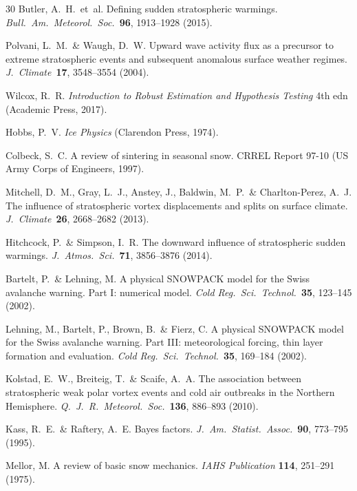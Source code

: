 \documentclass[11pt,letterpaper]{article}
\begin{document}
\begin{thebibliography}{30}
Butler, A.~H.\ et~al. Defining sudden stratospheric warmings. \textit{Bull.\ Am.\ Meteorol.\ Soc.}\ \textbf{96}, 1913--1928 (2015).

Polvani, L.~M.\ \& Waugh, D.~W. Upward wave activity flux as a precursor to extreme stratospheric events and subsequent anomalous surface weather regimes. \textit{J.\ Climate}\ \textbf{17}, 3548--3554 (2004).

Wilcox, R.~R. \textit{Introduction to Robust Estimation and Hypothesis Testing} 4th edn (Academic Press, 2017).

Hobbs, P.~V. \textit{Ice Physics} (Clarendon Press, 1974).

Colbeck, S.~C. A review of sintering in seasonal snow. CRREL Report 97-10 (US Army Corps of Engineers, 1997).

Mitchell, D.~M., Gray, L.~J., Anstey, J., Baldwin, M.~P.\ \& Charlton-Perez, A.~J. The influence of stratospheric vortex displacements and splits on surface climate. \textit{J.\ Climate}\ \textbf{26}, 2668--2682 (2013).

Hitchcock, P.\ \& Simpson, I.~R. The downward influence of stratospheric sudden warmings. \textit{J.\ Atmos.\ Sci.}\ \textbf{71}, 3856--3876 (2014).

Bartelt, P.\ \& Lehning, M. A physical SNOWPACK model for the Swiss avalanche warning. Part I: numerical model. \textit{Cold Reg.\ Sci.\ Technol.}\ \textbf{35}, 123--145 (2002).

Lehning, M., Bartelt, P., Brown, B.\ \& Fierz, C. A physical SNOWPACK model for the Swiss avalanche warning. Part III: meteorological forcing, thin layer formation and evaluation. \textit{Cold Reg.\ Sci.\ Technol.}\ \textbf{35}, 169--184 (2002).

Kolstad, E.~W., Breiteig, T.\ \& Scaife, A.~A. The association between stratospheric weak polar vortex events and cold air outbreaks in the Northern Hemisphere. \textit{Q.\ J.\ R.\ Meteorol.\ Soc.}\ \textbf{136}, 886--893 (2010).

Kass, R.~E.\ \& Raftery, A.~E. Bayes factors. \textit{J.\ Am.\ Statist.\ Assoc.}\ \textbf{90}, 773--795 (1995).

Mellor, M. A review of basic snow mechanics. \textit{IAHS Publication} \textbf{114}, 251--291 (1975).


\end{thebibliography}
\end{document}
